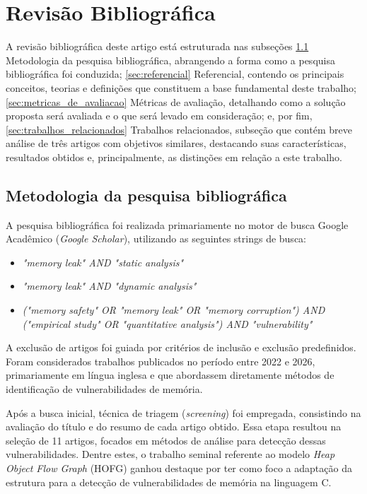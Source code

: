 \documentclass[
    12pt,                %
    openright,           %
    oneside,             %
    a4paper,             %
    english,             %
    brazil               %
]{abntex2}
\begin{document}
\chapter{Revisão Bibliográfica}
\label{cap:revisao}

A revisão bibliográfica deste artigo está estruturada nas subseções \ref{sec:metodologia_pesquisa} Metodologia da pesquisa bibliográfica, abrangendo a forma como a pesquisa bibliográfica foi conduzida; 
\ref{sec:referencial} Referencial, contendo os principais conceitos, teorias e definições que constituem a base fundamental deste trabalho; \ref{sec:metricas_de_avaliacao} Métricas de avaliação, detalhando como a solução proposta será avaliada e o que será levado em consideração; 
e, por fim, \ref{sec:trabalhos_relacionados} Trabalhos relacionados, subseção que contém breve análise de três artigos com objetivos similares, destacando suas características, resultados obtidos e, principalmente, as distinções em relação a este trabalho.


\section{Metodologia da pesquisa bibliográfica}
\label{sec:metodologia_pesquisa}

\par
A pesquisa bibliográfica foi realizada primariamente no motor de busca Google Acadêmico (\textit{Google Scholar}), utilizando as seguintes strings de busca:

\begin{itemize}
\item \textit{"memory leak" AND "static analysis"}
\item \textit{"memory leak" AND "dynamic analysis"}
\item \textit{("memory safety" OR "memory leak" OR "memory corruption") AND ("empirical study" OR "quantitative analysis") AND "vulnerability"}
\end{itemize}

\par
A exclusão de artigos foi guiada por critérios de inclusão e exclusão predefinidos. Foram considerados trabalhos publicados no período entre 2022 e 2026, primariamente em língua inglesa e que abordassem diretamente métodos de identificação de vulnerabilidades de memória.

\par
Após a busca inicial, técnica de triagem (\textit{screening}) foi empregada, consistindo na avaliação do título e do resumo de cada artigo obtido. Essa etapa resultou na seleção de 11 artigos, focados em métodos de análise para detecção dessas vulnerabilidades. 
Dentre estes, o trabalho seminal referente ao modelo \textit{Heap Object Flow Graph} (HOFG) ganhou destaque por ter como foco a adaptação da estrutura para a detecção de vulnerabilidades de memória na linguagem C.
\end{document}
